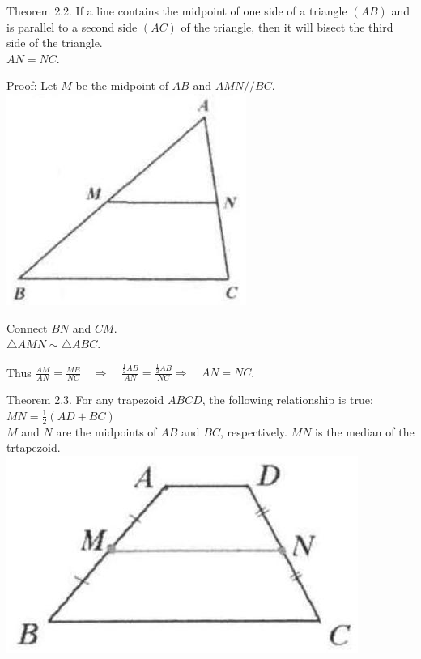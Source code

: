 \documentclass[10pt]{article}
\begin{document}
Theorem 2.2. If a line contains the midpoint of one side of a triangle \((A B)\) and is parallel to a second side \((A C)\) of the triangle, then it will bisect the third side of the triangle.\\
\(A N=N C\).

Proof:
Let \(M\) be the midpoint of \(A B\) and \(A M N / / B C\).\\
\includegraphics[max width=\textwidth, center]{2025_04_17_97bc1f7e44d93c271a88g-033(1)}

Connect \(B N\) and \(C M\).\\
\(\triangle A M N \sim \triangle A B C\).


Thus \(\frac{A M}{A N}=\frac{M B}{N C} \quad \Rightarrow \quad \frac{\frac{1}{2} A B}{A N}=\frac{\frac{1}{2} A B}{N C} \Rightarrow \quad A N=N C\).

Theorem 2.3. For any trapezoid \(A B C D\), the following relationship is true:\\
\(M N=\frac{1}{2}(A D+B C)\)\\
\(M\) and \(N\) are the midpoints of \(A B\) and \(B C\), respectively. \(M N\) is the median of the trtapezoid.\\
\includegraphics[max width=\textwidth, center]{2025_04_17_97bc1f7e44d93c271a88g-034(1)}
\end{document}
